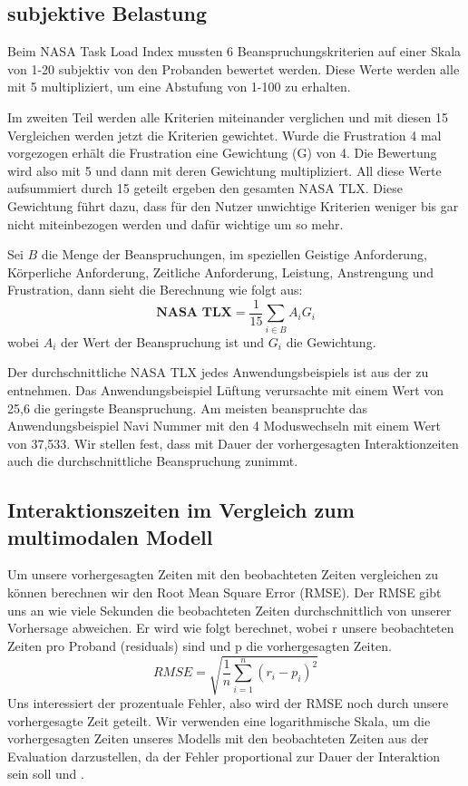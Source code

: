 \subsection{subjektive Belastung}
Beim NASA Task Load Index mussten 6 Beanspruchungskriterien auf einer Skala von 1-20 subjektiv von den Probanden bewertet werden. Diese Werte werden alle mit 5 multipliziert, um eine Abstufung von 1-100 zu erhalten. 

Im zweiten Teil werden alle Kriterien miteinander verglichen und mit diesen 15 Vergleichen werden jetzt die Kriterien gewichtet. Wurde die Frustration 4 mal vorgezogen erhält die Frustration eine Gewichtung (G) von 4. Die Bewertung wird also mit 5 und dann mit deren Gewichtung multipliziert. All diese Werte aufsummiert durch 15 geteilt ergeben den gesamten NASA TLX. Diese Gewichtung führt dazu, dass für den Nutzer unwichtige Kriterien weniger bis gar nicht miteinbezogen werden und dafür wichtige um so mehr. 

Sei $B$ die Menge der Beanspruchungen, im speziellen Geistige Anforderung, Körperliche Anforderung, Zeitliche Anforderung, Leistung, Anstrengung und Frustration, dann sieht die Berechnung wie folgt aus:
\[
\textbf{NASA TLX} =\frac{1}{15}\sum_{i \in B}A_{i}G_{i}
\]
wobei $A_i$ der Wert der Beanspruchung ist und $G_i$ die Gewichtung.

Der durchschnittliche NASA TLX jedes Anwendungsbeispiels ist aus der  zu entnehmen. Das Anwendungsbeispiel Lüftung verursachte mit einem Wert von 25,6 die geringste Beanspruchung. Am meisten beanspruchte das Anwendungsbeispiel Navi Nummer mit den 4 Moduswechseln mit einem Wert von 37,533.
Wir stellen fest, dass mit Dauer der vorhergesagten Interaktionzeiten auch die durchschnittliche Beanspruchung zunimmt.
\subsection[Ergebnisse der Interaktionszeiten]{Interaktionszeiten im Vergleich zum multimodalen Modell}
Um unsere vorhergesagten Zeiten mit den beobachteten Zeiten vergleichen zu können berechnen wir den Root Mean Square Error (RMSE). 
Der RMSE gibt uns an wie viele Sekunden die beobachteten Zeiten durchschnittlich von unserer Vorhersage abweichen.
Er wird wie folgt berechnet, wobei r unsere beobachteten Zeiten pro Proband (residuals) sind und p die vorhergesagten Zeiten.
\[
RMSE = \sqrt{\frac{1}{n}\sum_{i=1}^{n}(r_i - p_i)^2}
\]
Uns interessiert der prozentuale Fehler, also wird der RMSE noch durch unsere vorhergesagte Zeit geteilt. Wir verwenden eine logarithmische Skala, um die vorhergesagten Zeiten unseres Modells mit den beobachteten Zeiten aus der Evaluation darzustellen, da der Fehler proportional zur Dauer der Interaktion sein soll \citep{Card_1980} und \citep{schneegass_2009}. 

